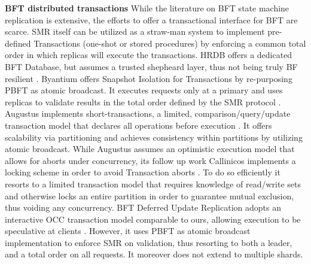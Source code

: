 \textbf{BFT distributed transactions}
While the literature on BFT state machine replication is extensive, the efforts to offer a transactional interface for BFT are scarce. SMR itself can be utilized as a straw-man system to implement pre-defined Transactions (one-shot or stored procedures) by enforcing a common total order in which replicas will execute the transactions. 
HRDB offers a dedicated BFT Database, but assumes a trusted shepheard layer, thus not being truly BF resilient \cite{vandiver2007tolerating}.
Byantium  offers Snapshot Isolation for Transactions by re-purposing PBFT as atomic broadcast. It executes requests only at a primary and uses replicas to validate results in the total order defined by the SMR protocol \cite{garcia2011efficient}. Augustus implements short-transactions, a limited, comparison/query/update transaction model that declares all operations before execution \cite{padilha2013augustus}. It offers scalability via partitioning and achieves consistency within partitions by utilizing atomic broadcast. While Augustus assumes an optimistic execution model that allows for aborts under concurrency, its follow up work Callinicos implements a locking scheme in order to avoid Transaction aborts \cite{padilha2016callinicos}. To do so efficiently it resorts to a limited transaction model that requires knowledge of read/write sets and otherwise locks an entire partition in order to guarantee mutual exclusion, thus voiding any concurrency. BFT Deferred Update Replication adopts an interactive OCC transaction model comparable to ours, allowing execution to be speculative at clients \cite{pedone2012byzantine}. However, it uses PBFT as atomic broadcast implementation to enforce SMR on validation, thus resorting to both a leader, and a total order on all requests. It moreover does not extend to multiple shards.

